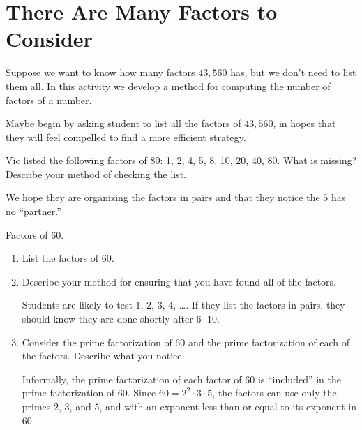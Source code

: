 \newpage
\section{There Are Many Factors to Consider}\label{A:CF}

Suppose we want to know how many factors $43,560$ has, but we don't need to list them all.  In this activity we develop a method for computing the number of factors of a number.  

\begin{teachingnote}
Maybe begin by asking student to list all the factors of $43,560$, in hopes that they will feel compelled to find a more efficient strategy.
\end{teachingnote}

\begin{prob}
Vic listed the following factors of 80:  1, 2, 4, 5, 8, 10, 20, 40, 80.  What is missing? Describe your method of checking the list.  
\vspace{0.2in}
\begin{teachingnote}
We hope they are organizing the factors in pairs and that they notice the $5$ has no ``partner.''  
\end{teachingnote}
\end{prob}

\begin{prob} Factors of 60. 
\begin{enumerate}
\item List the factors of 60. 
\vspace{0.2in}
\item Describe your method for ensuring that you have found all of the factors. 
\vspace{0.2in}
\begin{teachingnote}
Students are likely to test 1, 2, 3, 4, \dots.  If they list the factors in pairs, they should know they are done shortly after $6\cdot10$. 
\end{teachingnote}
\item Consider the prime factorization of 60 and the prime factorization of each of the factors.  Describe what you notice.   
\vspace{0.2in}
\begin{teachingnote}
Informally, the prime factorization of each factor of $60$ is ``included'' in the prime factorization of $60$.  Since $60=2^2\cdot 3\cdot5$, the factors can use only the primes $2$, $3$, and $5$, and with an exponent less than or equal to its exponent in $60$.  
\end{teachingnote}
\end{enumerate}
\end{prob}


